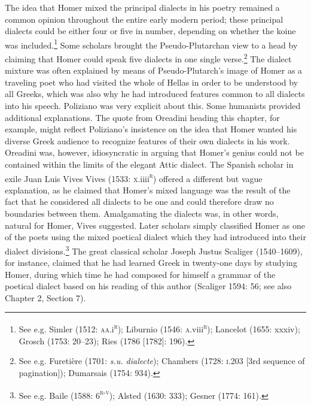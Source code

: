 \documentclass[12pt]{article}
\newenvironment{styleStandard}{\renewcommand\baselinestretch{1.25}\setlength\leftskip{0in}\setlength\rightskip{0in}\setlength\parindent{0.1972in}\setlength\parfillskip{0pt plus 1fil}\setlength\parskip{0in plus 1pt}\writerlistparindent\writerlistleftskip\leavevmode\normalfont\normalsize\writerlistlabel\ignorespaces}{\unskip\vspace{0in plus 1pt}\par}
\newcommand\writerlistleftskip{}
\newcommand\writerlistparindent{}
\newcommand\writerlistlabel{}
\begin{document}
\begin{styleStandard}
The idea that Homer mixed the principal dialects in his poetry remained a common opinion throughout the entire early modern period; these principal dialects could be either four or five in number, depending on whether the koine was included.\footnote{ See e.g. Simler (1512: \textsc{aa.}i\textsc{\textsuperscript{r}}); Liburnio (1546: \textsc{a}.viii\textsc{\textsuperscript{r}}); Lancelot (1655: xxxiv); Grosch (1753: 20–23); Ries (1786 [1782]: 196).} Some scholars brought the Pseudo-Plutarchan view to a head by claiming that Homer could speak five dialects in one single verse.\footnote{ See e.g. Furetière (1701: \textit{s.u. dialecte}); Chambers (1728: \textsc{i.}203 [3rd sequence of pagination]); Dumarsais (1754: 934).} The dialect mixture was often explained by means of Pseudo-Plutarch’s image of Homer as a traveling poet who had visited the whole of Hellas in order to be understood by all Greeks, which was also why he had introduced features common to all dialects into his speech. Poliziano was very explicit about this. Some humanists provided additional explanations. The quote from Oreadini heading this chapter, for example, might reflect Poliziano’s insistence on the idea that Homer wanted his diverse Greek audience to recognize features of their own dialects in his work. Oreadini was, however, idiosyncratic in arguing that Homer’s genius could not be contained within the limits of the elegant Attic dialect. The Spanish scholar in exile Juan Luis Vives Vives (1533: \textsc{x}.iiii\textsc{\textsuperscript{r}}) offered a different but vague explanation, as he claimed that Homer’s mixed language was the result of the fact that he considered all dialects to be one and could therefore draw no boundaries between them. Amalgamating the dialects was, in other words, natural for Homer, Vives suggested. Later scholars simply classified Homer as one of the poets using the mixed poetical dialect which they had introduced into their dialect divisions.\footnote{ See e.g. Baile (1588: 6\textsc{\textsuperscript{r-v}}); Alsted (1630: 333); Gesner (1774: 161).} The great classical scholar Joseph Justus Scaliger (1540–1609), for instance, claimed that he had learned Greek in twenty-one days by studying Homer, during which time he had composed for himself a grammar of the poetical dialect based on his reading of this author (Scaliger 1594: 56; see also Chapter 2, Section 7).
\end{styleStandard}
\end{document}
